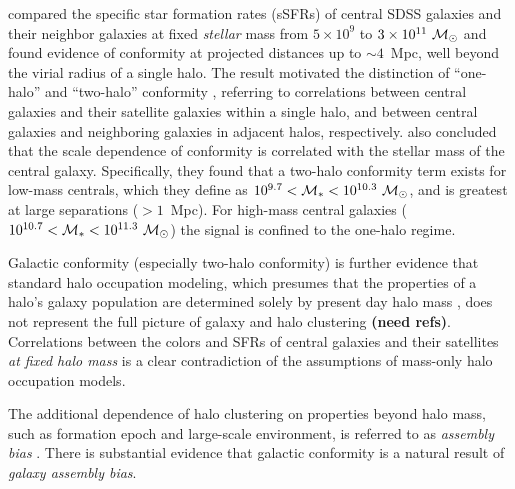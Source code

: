 \citet{Kauffmann13} compared the specific star formation rates (sSFRs) of central SDSS galaxies and their neighbor galaxies at fixed \emph{stellar} mass from $5\times10^9$ to $3\times10^{11}~\msun$ and found evidence of conformity at projected distances up to $\sim4$~Mpc, well beyond the virial radius of a single halo.
The \citet{Kauffmann13} result motivated the distinction of ``one-halo'' and ``two-halo'' conformity \citep*{Hearin15a}, referring to correlations between central galaxies and their satellite galaxies within a single halo, and between central galaxies and neighboring galaxies in adjacent halos, respectively.
\citet{Kauffmann13} also concluded that the scale dependence of conformity is correlated with the stellar mass of the central galaxy.
Specifically, they found that a two-halo conformity term exists for low-mass centrals, which they define as ${10^{9.7}<\mstar<10^{10.3}~\msun}$,
and is greatest at large separations ($>1$~Mpc).
For high-mass central galaxies (${10^{10.7}<\mstar<10^{11.3}~\msun}$) the signal is confined to the one-halo regime.

Galactic conformity (especially two-halo conformity) is further evidence that standard halo occupation modeling, which presumes that the properties of a halo's galaxy population are determined solely by present day halo mass 
, does not represent the full picture of galaxy and halo clustering {\bf(need refs)}.
Correlations between the colors and SFRs of central galaxies and their satellites \emph{at fixed halo mass} is a clear contradiction of the assumptions of mass-only halo occupation models.

The additional dependence of halo clustering on properties beyond halo mass, such as formation epoch and large-scale environment, is referred to as \emph{assembly bias} .
There is substantial evidence that galactic conformity is a natural result of \emph{galaxy assembly bias}.

